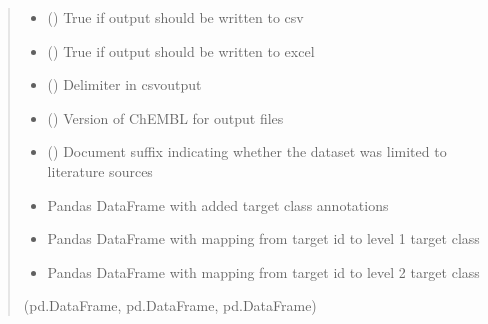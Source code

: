 \documentclass[letterpaper,10pt,english]{sphinxmanual}
\begin{document}
\begin{fulllineitems}
\begin{quote}
\begin{description}
\begin{itemize}
\item {} 
\sphinxAtStartPar
{} () \textendash{} True if output should be written to csv

\item {} 
\sphinxAtStartPar
{} () \textendash{} True if output should be written to excel

\item {} 
\sphinxAtStartPar
{} () \textendash{} Delimiter in csv\sphinxhyphen{}output

\item {} 
\sphinxAtStartPar
{} () \textendash{} Version of ChEMBL for output files

\item {} 
\sphinxAtStartPar
{} () \textendash{} Document suffix indicating
whether the dataset was limited to literature sources

\end{itemize}

\sphinxAtStartPar
\begin{itemize}
\item {} 
\sphinxAtStartPar
Pandas DataFrame with added target class annotations 

\item {} 
\sphinxAtStartPar
Pandas DataFrame with mapping from target id to level 1 target class 

\item {} 
\sphinxAtStartPar
Pandas DataFrame with mapping from target id to level 2 target class

\end{itemize}


\sphinxAtStartPar
(pd.DataFrame, pd.DataFrame, pd.DataFrame)

\end{description}\end{quote}

\end{fulllineitems}

\end{document}
